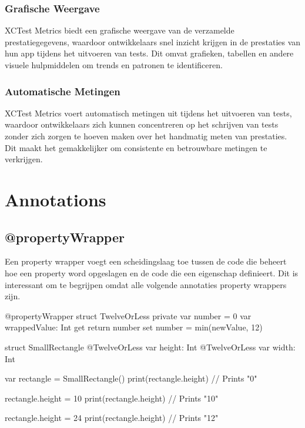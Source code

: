 \subsubsection{Grafische Weergave}
XCTest Metrics biedt een grafische weergave van de verzamelde prestatiegegevens, waardoor ontwikkelaars snel inzicht krijgen in de prestaties van hun app tijdens het uitvoeren van tests. Dit omvat grafieken, tabellen en andere visuele hulpmiddelen om trends en patronen te identificeren.
\subsubsection{Automatische Metingen}
XCTest Metrics voert automatisch metingen uit tijdens het uitvoeren van tests, waardoor ontwikkelaars zich kunnen concentreren op het schrijven van tests zonder zich zorgen te hoeven maken over het handmatig meten van prestaties. Dit maakt het gemakkelijker om consistente en betrouwbare metingen te verkrijgen.

\section{Annotations}
\subsection{@propertyWrapper}
\autocite{ApplePropertyWrapper} Een property wrapper voegt een scheidingslaag toe tussen de code die beheert hoe een property word opgeslagen en de code die een eigenschap definieert. Dit is interessant om te begrijpen omdat alle volgende annotaties property wrappers zijn.
\begin{swift}[caption=Example property wrapper code, label=property_wrapper_example]
    @propertyWrapper
    struct TwelveOrLess {
        private var number = 0
        var wrappedValue: Int {
            get { return number }
            set { number = min(newValue, 12) }
        }
    }
    
    struct SmallRectangle {
        @TwelveOrLess var height: Int
        @TwelveOrLess var width: Int
    }
    
    
    var rectangle = SmallRectangle()
    print(rectangle.height)
    // Prints "0"
    
    
    rectangle.height = 10
    print(rectangle.height)
    // Prints "10"
    
    
    rectangle.height = 24
    print(rectangle.height)
    // Prints "12"
\end{swift}


